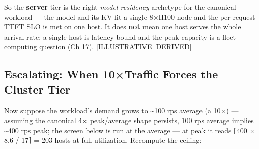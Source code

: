 So the \textbf{server} tier is the right \emph{model-residency}
archetype for the canonical workload --- the model and its KV fit a
single 8×H100 node and the per-request TTFT SLO is met on one host. It
does \textbf{not} mean one host serves the whole arrival rate; a single
host is latency-bound and the peak capacity is a fleet-computing
question (Ch 17). \mbox{{[}ILLUSTRATIVE{]}}\hspace{0pt}\mbox{{[}DERIVED{]}}

\subsection{Escalating: When 10×Traffic Forces the Cluster
Tier}\label{escalating-when-10traffic-forces-the-cluster-tier}

Now suppose the workload's demand grows to \textasciitilde100 rps
average (a 10×) --- assuming the canonical 4× peak/average shape
persists, 100 rps average implies \textasciitilde400 rps peak; the
screen below is run at the average --- at peak it reads ⌈400 × 8.6 / 17⌉
= 203 hosts at full utilization. Recompute the ceiling:

